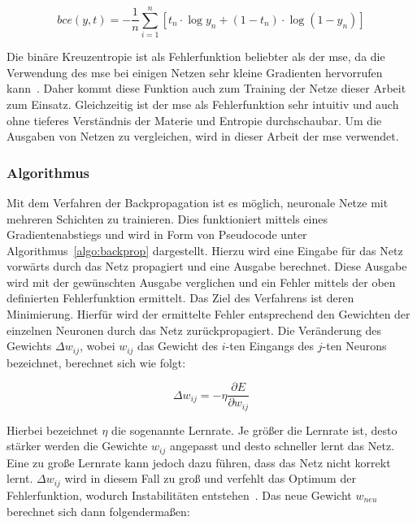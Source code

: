 \begin{equation}
    bce(y,t) = - \frac{1}{n} \sum^n_{i=1}[t_n \cdot \log y_n + (1-t_n) \cdot \log (1-y_n)]
\end{equation}

Die binäre Kreuzentropie ist als Fehlerfunktion beliebter als der \gls{mse}, da die Verwendung des \gls{mse} bei einigen Netzen sehr kleine Gradienten hervorrufen kann~\cite[S. 199]{goodfellowDeepLearningUmfassende2018}. Daher kommt diese Funktion auch zum Training der Netze dieser Arbeit zum Einsatz. Gleichzeitig ist der \gls{mse} als Fehlerfunktion sehr intuitiv und auch ohne tieferes Verständnis der Materie und Entropie durchschaubar. Um die Ausgaben von Netzen zu vergleichen, wird in dieser Arbeit der \gls{mse} verwendet.

\subsubsection{Algorithmus}

Mit dem Verfahren der Backpropagation ist es möglich, neuronale Netze mit mehreren Schichten zu trainieren. Dies funktioniert mittels eines Gradientenabstiegs und wird in Form von Pseudocode unter Algorithmus~\ref{algo:backprop} dargestellt. Hierzu wird eine Eingabe für das Netz vorwärts durch das Netz propagiert und eine Ausgabe berechnet. Diese Ausgabe wird mit der gewünschten Ausgabe verglichen und ein Fehler mittels der oben definierten Fehlerfunktion ermittelt. Das Ziel des Verfahrens ist deren Minimierung. Hierfür wird der ermittelte Fehler entsprechend den Gewichten der einzelnen Neuronen durch das Netz zurückpropagiert. Die Veränderung des Gewichts $\Delta w_{ij}$, wobei $w_{ij}$ das Gewicht des $i$-ten Eingangs des $j$-ten Neurons bezeichnet, berechnet sich wie folgt:

\begin{equation}
    \Delta w_{ij} = - \eta \frac{\partial E}{\partial w_{ij}}
\end{equation}

Hierbei bezeichnet $\eta$ die sogenannte Lernrate. Je größer die Lernrate ist, desto stärker werden die Gewichte $w_{ij}$ angepasst und desto schneller lernt das Netz. Eine zu große Lernrate kann jedoch dazu führen, dass das Netz nicht korrekt lernt. $\Delta w_{ij}$ wird in diesem Fall zu groß und verfehlt das Optimum der Fehlerfunktion, wodurch Instabilitäten entstehen~\cite[S.\,329]{goodfellowDeepLearningUmfassende2018}. Das neue Gewicht $w_{neu}$ berechnet sich dann folgendermaßen:

